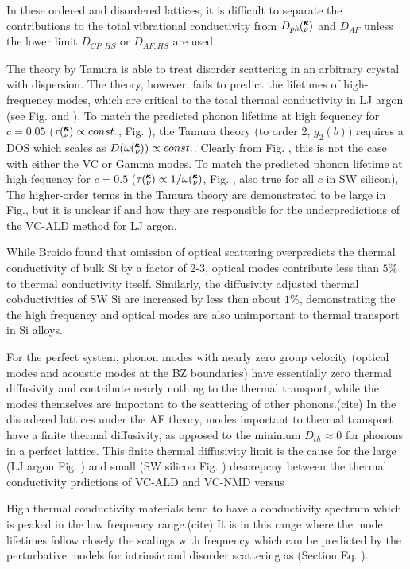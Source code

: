 \documentclass[aps,prb,twocolumn,superscriptaddress,amsmath,amssymb,floatfix]{revtex4}
\newcommand{\kv}{\mspace{-4.0mu}\left(\mspace{-8.0mu}
\begin{smallmatrix}&\pmb{\kappa} \\&\nu\end{smallmatrix}
\mspace{-3.0mu}\right)}
\begin{document}
In these ordered and disordered lattices, it is difficult to separate 
the contributions to the total vibrational 
conductivity from $D_{ph}\kv$ and $D_{AF}$ unless the lower limit 
$D_{CP,HS}$ or $D_{AF,HS}$ are used.  

The theory by Tamura is able to treat disorder scattering in an arbitrary 
crystal with dispersion. The theory, however, fails to predict the 
lifetimes of high-frequency modes, which are critical to the total 
thermal conductivity in LJ argon (see Fig. and ). To match the predicted 
phonon lifetime at high fequency for $c=0.05$ 
($\tau\kv \propto const.$, Fig. ), 
the Tamura theory (to order 2, $g_2(b)$) requires a DOS which scales as 
$D(\omega\kv) \propto const.$. Clearly from Fig. , this is not the case 
with either the VC or Gamma modes. To match the predicted 
phonon lifetime at high fequency for $c=0.5$ 
($\tau\kv \propto 1/\omega\kv$, Fig. , also true for all $c$ in SW silicon), 
The higher-order terms in the Tamura theory are demonstrated to be large 
in Fig., but it is unclear if and how they are responsible for the 
underpredictions of the VC-ALD method for LJ argon. 

While Broido found that omission of optical scattering overpredicts 
the thermal 
conductivity of bulk Si by a factor of 2-3, 
optical modes contribute less than $5\%$ 
to thermal conductivity itself. Similarly, the diffusivity adjusted thermal 
cobductivities of SW Si are increased by less then about $1\%$, demonstrating the 
the high frequency and optical modes are also unimportant to thermal transport 
in Si alloys. 

For the perfect system, phonon modes with nearly zero group velocity 
(optical modes and acoustic modes at the BZ boundaries) have essentially 
zero thermal diffusivity and contribute nearly 
nothing to the thermal transport, while the modes themselves 
are important to the 
scattering of other phonons.(cite) In the disordered lattices under the 
AF theory, modes important to thermal transport have a finite thermal 
diffusivity, as opposed to  the minimum $D_{th} \approx 0 $ for phonons 
in a perfect lattice. This finite thermal diffusivity limit is the cause 
for the large (LJ argon Fig. ) and small (SW silicon Fig. ) 
descrepcny between the thermal conductivity prdictions of VC-ALD and 
VC-NMD versus 

High thermal conductivity materials tend to have a conductivity spectrum 
which is peaked in the low frequency range.(cite) 
It is in this range where the mode 
lifetimes follow closely the scalings with frequency which can be 
predicted by the perturbative models for intrinsic and disorder scattering as 
(Section Eq. ).
\end{document}
